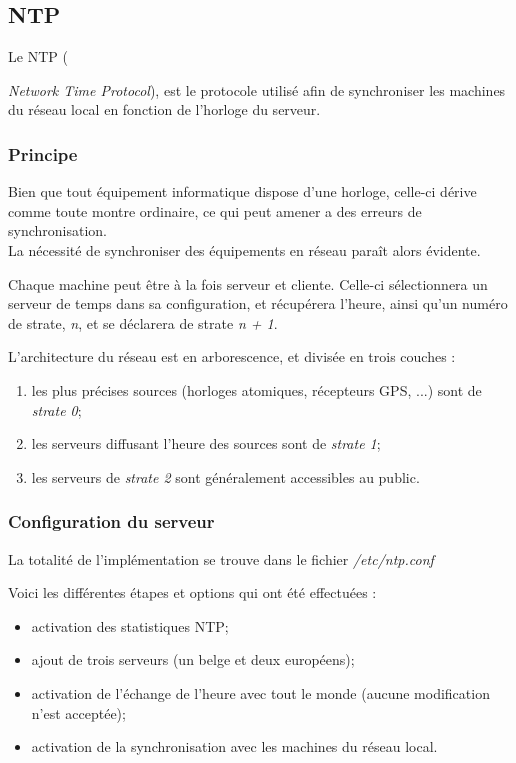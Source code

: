 \subsection{NTP}
\label{subsec:ntp}

Le NTP ({\emph{Network Time Protocol}), est le protocole utilisé afin
de synchroniser les machines du réseau local en fonction de l'horloge du
serveur.

\subsubsection{Principe}
\label{subsubsec:principe}

Bien que tout équipement informatique dispose d'une horloge, celle-ci
dérive comme toute montre ordinaire, ce qui peut amener a des erreurs de
synchronisation. \\
La nécessité de synchroniser des équipements en réseau paraît alors évidente.

Chaque machine peut être à la fois serveur et cliente.  Celle-ci sélectionnera
un serveur de temps dans sa configuration, et récupérera l'heure, ainsi qu'un
numéro de strate, \emph{n}, et se déclarera de strate \emph{n + 1}.

L'architecture du réseau est en arborescence, et divisée en trois couches :
\begin{enumerate}
\item les plus précises sources (horloges atomiques, récepteurs GPS, ...) sont
de \emph{strate 0};

\item les serveurs diffusant l'heure des sources sont de \emph{strate 1};

\item les serveurs de \emph{strate 2} sont généralement accessibles au public.
\end{enumerate}

\subsubsection{Configuration du serveur}
\label{subsubsec:configuration-serveur}

La totalité de l'implémentation se trouve dans le fichier
\textit{/etc/ntp.conf}

Voici les différentes étapes et options qui ont été effectuées :
\begin{itemize}
\item activation des statistiques NTP;
\item ajout de trois serveurs (un belge et deux européens);
\item activation de l'échange de l'heure avec tout le monde (aucune
  modification n'est acceptée);
\item activation de la synchronisation avec les machines du réseau local.
\end{itemize}

}
